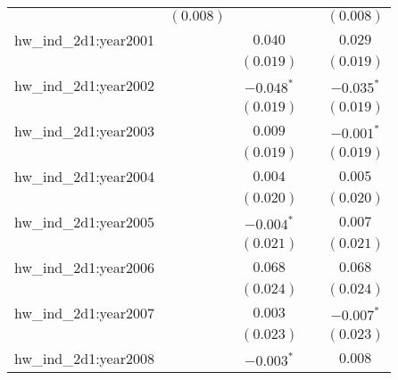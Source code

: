 \begin{center}
\begin{longtable}{l c c c c}
                         & $(0.008)$             &                       &                       & $(0.008)$             \\
hw\_ind\_2d1:year2001    &                       & $0.040$               &                       & $0.029$               \\
                         &                       & $(0.019)$             &                       & $(0.019)$             \\
hw\_ind\_2d1:year2002    &                       & $\mathbf{-0.048}^{*}$ &                       & $\mathbf{-0.035}^{*}$ \\
                         &                       & $(0.019)$             &                       & $(0.019)$             \\
hw\_ind\_2d1:year2003    &                       & $0.009$               &                       & $\mathbf{-0.001}^{*}$ \\
                         &                       & $(0.019)$             &                       & $(0.019)$             \\
hw\_ind\_2d1:year2004    &                       & $0.004$               &                       & $0.005$               \\
                         &                       & $(0.020)$             &                       & $(0.020)$             \\
hw\_ind\_2d1:year2005    &                       & $\mathbf{-0.004}^{*}$ &                       & $0.007$               \\
                         &                       & $(0.021)$             &                       & $(0.021)$             \\
hw\_ind\_2d1:year2006    &                       & $0.068$               &                       & $0.068$               \\
                         &                       & $(0.024)$             &                       & $(0.024)$             \\
hw\_ind\_2d1:year2007    &                       & $0.003$               &                       & $\mathbf{-0.007}^{*}$ \\
                         &                       & $(0.023)$             &                       & $(0.023)$             \\
hw\_ind\_2d1:year2008    &                       & $\mathbf{-0.003}^{*}$ &                       & $0.008$               \\

\end{longtable}
\end{center}
